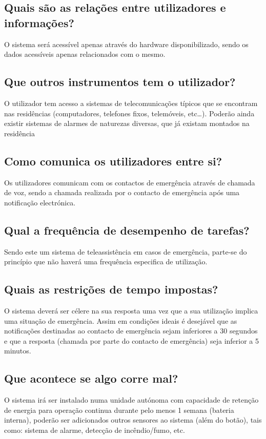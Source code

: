 \subsection{Quais são as relações entre utilizadores e informações?}
O sistema será acessível apenas através do hardware disponibilizado, sendo os dados acessíveis apenas relacionados com o mesmo.

\subsection{Que outros instrumentos tem o utilizador?}
O utilizador tem acesso a sistemas de telecomunicações típicos que se encontram nas residências (computadores, telefones fixos, telemóveis, etc…). Poderão ainda existir sistemas de alarmes de naturezas diversas, que já existam montados na residência

\subsection{Como comunica os utilizadores entre si?}
Os utilizadores comunicam com os contactos de emergência através de chamada de voz, sendo a chamada realizada por o contacto de emergência após uma notificação electrónica.

\subsection{Qual a frequência de desempenho de tarefas?}
Sendo este um sistema de teleassistência em casos de emergência, parte-se do princípio que não haverá uma frequência especifica de utilização.

\subsection{Quais as restrições de tempo impostas?}
O sistema deverá ser célere na sua resposta uma vez que a sua utilização implica uma situação de emergência. Assim em condições ideais é desejável que as notificações destinadas ao contacto de emergência sejam inferiores a 30 segundos e que a resposta (chamada por parte do contacto de emergência) seja inferior a 5 minutos.

\subsection{Que acontece se algo corre mal?}
O sistema irá ser instalado numa unidade autónoma com capacidade de retenção de energia para operação continua durante pelo menos 1 semana (bateria interna), poderão ser adicionados outros sensores ao sistema (além do botão), tais como: sistema de alarme, detecção de incêndio/fumo, etc.

